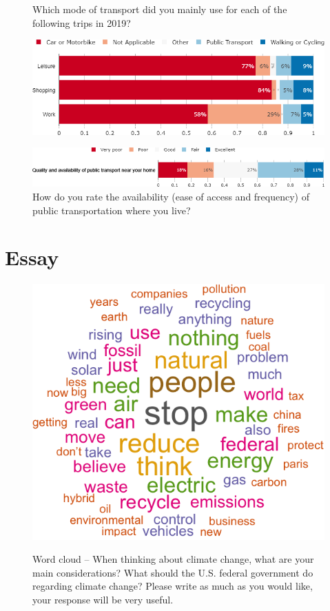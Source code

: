\documentclass[aspectratio=169,9pt,dvipsnames]{beamer}
\begin{document}
\begin{frame}{}%
\begin{figure}[h!]
\centering
\caption{Which mode of transport did you mainly use for each of the following trips in 2019?}
\includegraphics[width=.7\textwidth]{../figures/US/transport_US.png} \\
\vspace{.5cm}
\caption{How do you rate the availability (ease of access and frequency) of public transportation where you live?}
\includegraphics[width=.9\textwidth]{../figures/US/availability_transport_US.png}
\end{figure}
\end{frame}

\section{Essay}


\begin{frame}{}%
\begin{figure}[h!]
\centering
\caption{Word cloud -- When thinking about climate change, what are your main considerations? What should the U.S. federal government do regarding climate change?
Please write as much as you would like, your response will be very useful.}
\includegraphics[width=.5\textwidth]{../figures/US/cloud.png} \\
\end{figure}
\end{frame}
\end{document}
